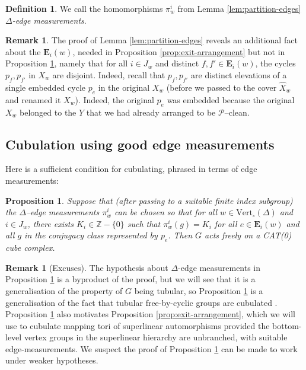 \documentclass[11pt,oneside]{amsart}
\newtheorem{prop}[thm]{Proposition}
\theoremstyle{definition}
\newtheorem{defn}[thm]{Definition}
\newtheorem{rem}[thm]{Remark}
\newcommand{\field}[1]{\mathbb{#1}}
\newcommand{\integers}{\ensuremath{\field{Z}}}
\newcommand{\vertices}{\mathrm{Vert}}
\begin{document}
\begin{defn}
We call the homomorphisms $\pi^i_w$ from Lemma \ref{lem:partition-edges} \emph{$\Delta$-edge measurements}.
\end{defn}

\begin{rem}\label{rem:disjoint-cycles-in-partition}
The proof of Lemma \ref{lem:partition-edges} reveals an additional fact about the $\mathbf E_i(w)$, needed in Proposition \ref{prop:exit-arrangement} but not in Proposition \ref{prop:general-linear}, namely that for all $i\in J_w$ and distinct $f,f'\in\mathbf E_i(w)$, the cycles $p_f,p_{f'}$ in $X_w$ are disjoint.  Indeed, recall that $p_f,p_{f'}$ are distinct elevations of a single embedded cycle $p_e$ in the original $X_w$ (before we passed to the cover $\widehat X_w$ and renamed it $X_w$).  Indeed, the original $p_e$ was embedded because the original $X_w$ belonged to the $Y$ that we had already arranged to be $\mathcal P$--clean.
\end{rem}

\subsection{Cubulation using good edge measurements}\label{subsec:good-edge-measurements}
Here is a sufficient condition for cubulating, phrased in terms of edge measurements:

\begin{prop}\label{prop:general-linear}
Suppose that (after passing to a suitable finite index subgroup) the $\Delta$--edge measurements $\pi^i_w$ can be chosen so that for all $w\in\vertices_\circ(\Delta)$ and $i\in J_w$, there exists $K_i\in\integers-\{0\}$ such that $\pi^i_w(g)=K_i$ for all $e\in\mathbf E_i(w)$ and all $g$ in the conjugacy class represented by $p_e$.  Then $G$ acts freely on a CAT(0) cube complex.
\end{prop}

\begin{rem}[Excuses]\label{rem:edge-measure}
The hypothesis about $\Delta$-edge measurements in Proposition \ref{prop:general-linear} is a byproduct of the proof, but we will see that it is a generalisation of the property of $G$ being tubular, so Proposition \ref{prop:general-linear} is a generalisation of the fact that tubular free-by-cyclic groups are cubulated \cite[Thm. 2.1, Thm. 2.4]{Button:tubular-cubes}.  Proposition \ref{prop:general-linear} also motivates Proposition \ref{prop:exit-arrangement}, which we will use to cubulate mapping tori of superlinear automorphisms provided the bottom-level vertex groups in the superlinear hierarchy are unbranched, with suitable edge-measurements.  We suspect the proof of Proposition \ref{prop:general-linear} can be made to work under weaker hypotheses.
\end{rem}
\end{document}
